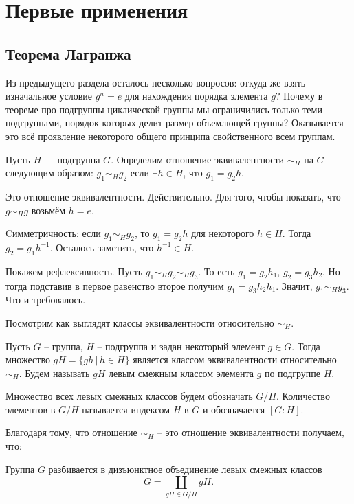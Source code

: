 \section{Первые применения}

\subsection{Теорема Лагранжа}


Из предыдущего раздела осталось несколько вопросов: откуда же взять изначальное условие $g^n=e$ для нахождения порядка элемента $g$? Почему в теореме про подгруппы циклической группы мы ограничились только теми подгруппами, порядок которых делит размер объемлющей группы? Оказывается это всё проявление некоторого общего принципа свойственного всем группам.


\dfn Пусть $H$ --- подгруппа $G$. Определим отношение эквивалентности $\sim_H$ на $G$ следующим образом: $g_1\sim_H g_2$ если $\exists h \in H$, что $g_1=g_2 h$.
\edfn

\utv Это отношение эквивалентности.
\eutv
\proof Действительно. Для того, чтобы показать, что $g\sim_H g$ возьмём $h=e$. 

Cимметричность: если $g_1 \sim_H g_2$, то $g_1=g_2h$ для некоторого $h\in H$. Тогда $g_2=g_1h^{-1}$. Осталось заметить, что $h^{-1}\in H$.

Покажем рефлексивность. Пусть $g_1\sim_H g_2 \sim_H g_3$.  То есть $g_1=g_2h_1$, $g_2=g_3h_2$. Но тогда подставив в первое равенство второе получим $g_1=g_3h_2h_1$. Значит, $g_1\sim_H g_3$. Что и требовалось. 
\endproof

Посмотрим как выглядят классы эквивалентности относительно $\sim_H$.

\dfn Пусть $G$ -- группа, $H$ -- подгруппа и задан некоторый элемент $g\in G$. Тогда множество $gH=\{ gh\,|\, h \in H\}$ является классом эквивалентности относительно $\sim_H$. Будем называть $gH$ левым смежным  классом элемента $g$ по подгруппе $H$. 
\edfn

\dfn Множество всех левых смежных классов будем обозначать $G/H$. Количество элементов в $G/H$ называется индексом $H$ в $G$  и обозначается $[G:H]$. 
\edfn

Благодаря тому, что отношение $\sim_H$ -- это отношение эквивалентности получаем, что:


\crl Группа $G$ разбивается в дизъюнктное объединение левых смежных классов $$G=\coprod_{ gH \in G/H} gH.$$
\ecrl




